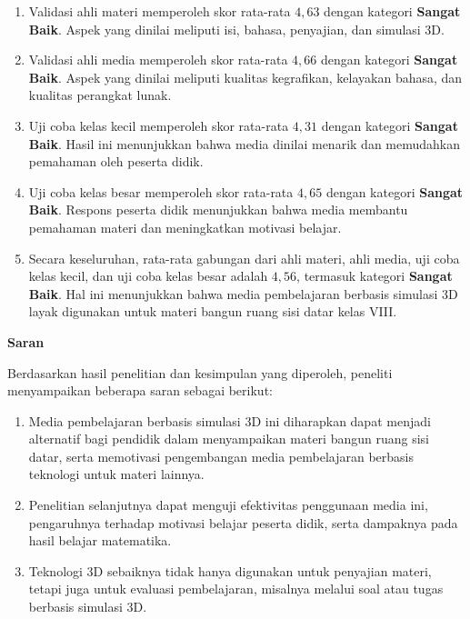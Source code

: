 \begin{enumerate}
\begin{enumerate}[leftmargin=*, label=\arabic*)]
        \item Validasi ahli materi memperoleh skor rata-rata \(4{,}63\) dengan kategori \textbf{Sangat Baik}. Aspek yang dinilai meliputi isi, bahasa, penyajian, dan simulasi 3D.
        \item Validasi ahli media memperoleh skor rata-rata \(4{,}66\) dengan kategori \textbf{Sangat Baik}. Aspek yang dinilai meliputi kualitas kegrafikan, kelayakan bahasa, dan kualitas perangkat lunak.
        \item Uji coba kelas kecil memperoleh skor rata-rata \(4{,}31\) dengan kategori \textbf{Sangat Baik}. Hasil ini menunjukkan bahwa media dinilai menarik dan memudahkan pemahaman oleh peserta didik.
        \item Uji coba kelas besar memperoleh skor rata-rata \(4{,}65\) dengan kategori \textbf{Sangat Baik}. Respons peserta didik menunjukkan bahwa media membantu pemahaman materi dan meningkatkan motivasi belajar.
        \item Secara keseluruhan, rata-rata gabungan dari ahli materi, ahli media, uji coba kelas kecil, dan uji coba kelas besar adalah \(4{,}56\), termasuk kategori \textbf{Sangat Baik}. Hal ini menunjukkan bahwa media pembelajaran berbasis simulasi 3D layak digunakan untuk materi bangun ruang sisi datar kelas VIII.
    \end{enumerate}
\end{enumerate}
\textbf{Saran}\\
\hspace*{1cm}Berdasarkan hasil penelitian dan kesimpulan yang diperoleh, peneliti menyampaikan beberapa saran sebagai berikut:
\begin{enumerate}
    \item Media pembelajaran berbasis simulasi 3D ini diharapkan dapat menjadi alternatif bagi pendidik dalam menyampaikan materi bangun ruang sisi datar, serta memotivasi pengembangan media pembelajaran berbasis teknologi untuk materi lainnya.
    \item Penelitian selanjutnya dapat menguji efektivitas penggunaan media ini, pengaruhnya terhadap motivasi belajar peserta didik, serta dampaknya pada hasil belajar matematika.
    \item Teknologi 3D sebaiknya tidak hanya digunakan untuk penyajian materi, tetapi juga untuk evaluasi pembelajaran, misalnya melalui soal atau tugas berbasis simulasi 3D.
\end{enumerate}
